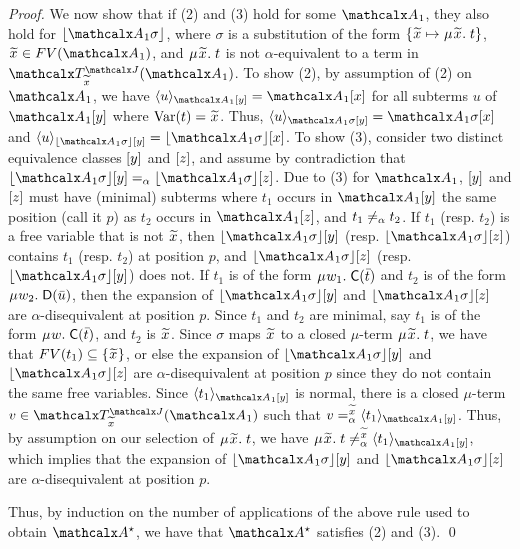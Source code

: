\begin{rep}
\begin{proof}
We now show that if (2) and (3) hold for some $\Val_1$,
they also hold for $\nf{\Val_1 \sigma}$,
where $\sigma$ is a substitution of the form $\{ {\Varec{x}} \mapsto \MU{\Varec{x}}.\; t \}$,
${\Varec{x}} \in FV( \Val_1 )$,
and $\MU {\Varec{x}}.\; t$ is not $\alpha$-equivalent to a term in $\Terms^{\smash{\J}}_{\Varec{x}}(\Val_1)$.
To show (2),
by assumption of (2) on $\Val_1$, we have $\interp{\Val_1 \ec{y}}{ u } = \Val_1 \ec{x}$ for
all subterms $u$ of $\Val_1 \ec{y}$ where $\muvar(t) = {\Varec{x}}$.
Thus, $\interp{\Val_1 \sigma \ec{y}}{ u } = \Val_1 \sigma \ec{x}$ and
$\interp{\nf{\Val_1 \sigma} \ec{y}}{ u } = \nf{\Val_1 \sigma} \ec{x}$.
To show (3),
consider two distinct equivalence classes $[y]$ and $[z]$,
and assume by contradiction that $\nf{\Val_1 \sigma} \ec{y} \aequiv \nf{\Val_1 \sigma} \ec{z}$.
Due to (3) for $\Val_1$,
$[y]$ and $[z]$ must have (minimal) subterms
where $t_1$ occurs in $\Val_1 \ec{y}$ the same position (call it $p$) as $t_2$ occurs in $\Val_1 \ec{z}$,
and $t_1 \not\mathrel{=_\alpha} t_2$.
If $t_1$ (resp. $t_2$) is a free variable that is not ${\Varec{x}}$,
then $\nf{\Val_1 \sigma} \ec{y}$ (resp. $\nf{\Val_1 \sigma} \ec{z}$)
contains $t_1$ (resp. $t_2$) at position $p$,
and $\nf{\Val_1 \sigma} \ec{z}$ (resp. $\nf{\Val_1 \sigma} \ec{y}$) does not.
If $t_1$ is of the form $\MU w_1.\; \const{C}( \vec t )$
and $t_2$ is of the form $\MU w_2.\; \const{D}( \vec u )$,
then the expansion %
of $\nf{\Val_1 \sigma} \ec{y}$ and $\nf{\Val_1 \sigma} \ec{z}$
are $\alpha$-disequivalent at position $p$.
Since $t_1$ and $t_2$ are minimal,
say $t_1$ is of the form $\MU w.\; \const{C}( \vec t )$,
and $t_2$ is ${\Varec{x}}$.
Since $\sigma$ maps ${\Varec{x}}$ to a closed $\mu$-term $\MU {\Varec{x}}.\; t$,
we have that $FV( t_1 ) \subseteq \{ {\Varec{x}} \}$,
or else the expansion of $\nf{\Val_1 \sigma} \ec{y}$ and $\nf{\Val_1 \sigma} \ec{z}$
are $\alpha$-disequivalent at position $p$ since they do not contain the same free variables.
Since $\interp{\Val_1 \ec{y}}{t_1}$ is normal,
there is a closed $\mu$-term $v \in \Terms^{\smash{\J}}_{\Varec{x}}( \Val_1 )$
such that $v \vsimv{\Varec{x}} \interp{\Val_1 \ec{y}}{t_1}$.
Thus, by assumption on our selection of $\MU {\Varec{x}}.\; t$,
we have $\MU {\Varec{x}}.\; t \not\vsimv{\Varec{x}} \interp{\Val_1 \ec{y}}{t_1}$,
which implies that the expansion of $\nf{\Val_1 \sigma} \ec{y}$ and $\nf{\Val_1 \sigma} \ec{z}$
are $\alpha$-disequivalent at position $p$. %

Thus, by induction on the number of applications of the above rule used to obtain $\ValC$,
we have that $\ValC$ satisfies (2) and (3).
\qed
\end{proof}
\end{rep}

